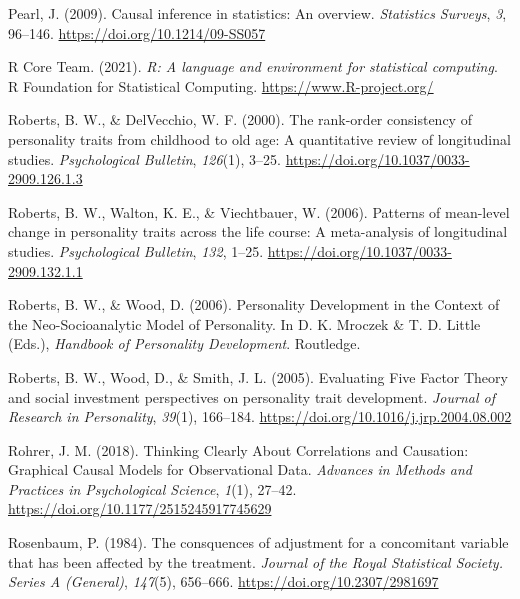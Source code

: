 \documentclass[
  english,
  man, noextraspace]{apa7}
\begin{document}
\leavevmode\hypertarget{ref-pearlCausalInferenceStatistics2009}{}%
Pearl, J. (2009). Causal inference in statistics: An overview. \emph{Statistics Surveys}, \emph{3}, 96--146. \url{https://doi.org/10.1214/09-SS057}

\leavevmode\hypertarget{ref-R-base}{}%
R Core Team. (2021). \emph{R: A language and environment for statistical computing}. R Foundation for Statistical Computing. \url{https://www.R-project.org/}

\leavevmode\hypertarget{ref-robertsRankorderConsistencyPersonality2000}{}%
Roberts, B. W., \& DelVecchio, W. F. (2000). The rank-order consistency of personality traits from childhood to old age: A quantitative review of longitudinal studies. \emph{Psychological Bulletin}, \emph{126}(1), 3--25. \url{https://doi.org/10.1037/0033-2909.126.1.3}

\leavevmode\hypertarget{ref-robertsPatternsMeanlevelChange2006a}{}%
Roberts, B. W., Walton, K. E., \& Viechtbauer, W. (2006). Patterns of mean-level change in personality traits across the life course: A meta-analysis of longitudinal studies. \emph{Psychological Bulletin}, \emph{132}, 1--25. \url{https://doi.org/10.1037/0033-2909.132.1.1}

\leavevmode\hypertarget{ref-robertsPersonalityDevelopmentContext2006}{}%
Roberts, B. W., \& Wood, D. (2006). Personality Development in the Context of the Neo-Socioanalytic Model of Personality. In D. K. Mroczek \& T. D. Little (Eds.), \emph{Handbook of Personality Development}. Routledge.

\leavevmode\hypertarget{ref-robertsEvaluatingFiveFactor2005}{}%
Roberts, B. W., Wood, D., \& Smith, J. L. (2005). Evaluating Five Factor Theory and social investment perspectives on personality trait development. \emph{Journal of Research in Personality}, \emph{39}(1), 166--184. \url{https://doi.org/10.1016/j.jrp.2004.08.002}

\leavevmode\hypertarget{ref-rohrerThinkingClearlyCorrelations2018}{}%
Rohrer, J. M. (2018). Thinking Clearly About Correlations and Causation: Graphical Causal Models for Observational Data. \emph{Advances in Methods and Practices in Psychological Science}, \emph{1}(1), 27--42. \url{https://doi.org/10.1177/2515245917745629}

\leavevmode\hypertarget{ref-rosenbaumConsquencesAdjustmentConcomitant1984}{}%
Rosenbaum, P. (1984). The consquences of adjustment for a concomitant variable that has been affected by the treatment. \emph{Journal of the Royal Statistical Society. Series A (General)}, \emph{147}(5), 656--666. \url{https://doi.org/10.2307/2981697}
\end{document}
